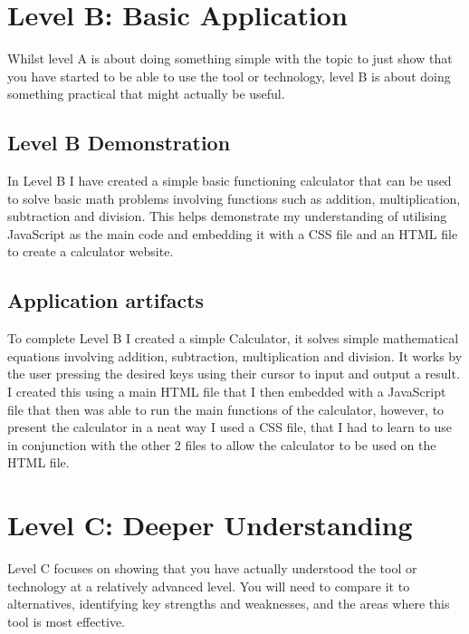 \documentclass[a4paper, 11pt]{report}
\begin{document}

\newpage
\section{Level B: Basic Application}

Whilst level A is about doing something simple with the topic to just show that you have started to be able to use the tool or technology, level B is about doing something practical that might actually be useful.

\subsection{Level B Demonstration}

In Level B I have created a simple basic functioning calculator that can be used to solve basic math problems involving functions such as addition, multiplication, subtraction and division. This helps demonstrate my understanding of utilising JavaScript as the main code and embedding it with a CSS file and an HTML file to create a calculator website. 

\subsection{Application artifacts}

To complete Level B I created a simple Calculator, it solves simple mathematical equations involving addition, subtraction, multiplication and division. It works by the user pressing the desired keys using their cursor to input and output a result. I created this using a main HTML file that I then embedded with a JavaScript file that then was able to run the main functions of the calculator, however, to present the calculator in a neat way I used a CSS file, that I had to learn to use in conjunction with the other 2 files to allow the calculator to be used on the HTML file. 



\newpage
\section{Level C: Deeper Understanding}

Level C focuses on showing that you have actually understood the tool or technology at a relatively advanced level. You will need to compare it to alternatives, identifying key strengths and weaknesses, and the areas where this tool is most effective. 
\end{document}
